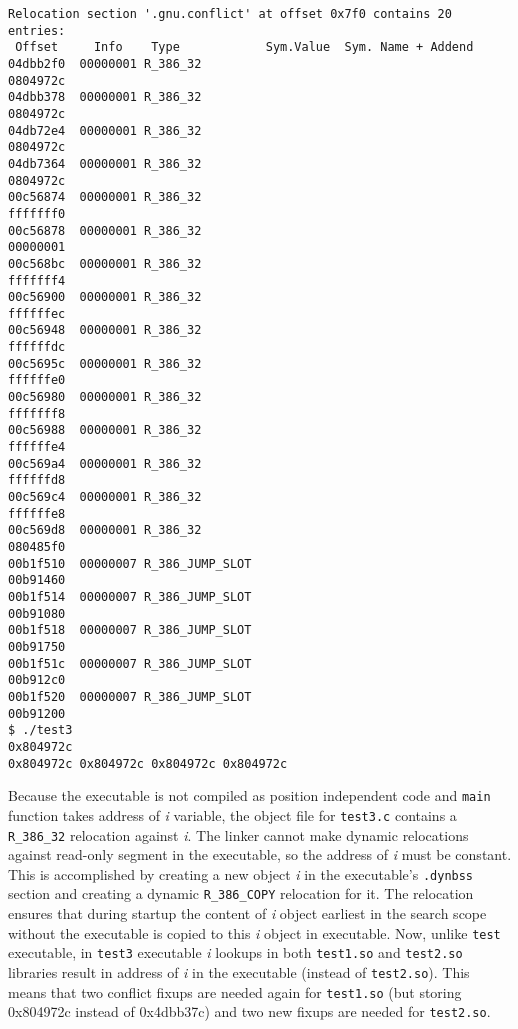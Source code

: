 \documentclass[twoside]{article}
\def\tts#1{\texttt{\small #1}}
\begin{document}
{{\begin{verbatim}
Relocation section '.gnu.conflict' at offset 0x7f0 contains 20 entries:
 Offset     Info    Type            Sym.Value  Sym. Name + Addend
04dbb2f0  00000001 R_386_32                                     0804972c
04dbb378  00000001 R_386_32                                     0804972c
04db72e4  00000001 R_386_32                                     0804972c
04db7364  00000001 R_386_32                                     0804972c
00c56874  00000001 R_386_32                                     fffffff0
00c56878  00000001 R_386_32                                     00000001
00c568bc  00000001 R_386_32                                     fffffff4
00c56900  00000001 R_386_32                                     ffffffec
00c56948  00000001 R_386_32                                     ffffffdc
00c5695c  00000001 R_386_32                                     ffffffe0
00c56980  00000001 R_386_32                                     fffffff8
00c56988  00000001 R_386_32                                     ffffffe4
00c569a4  00000001 R_386_32                                     ffffffd8
00c569c4  00000001 R_386_32                                     ffffffe8
00c569d8  00000001 R_386_32                                     080485f0
00b1f510  00000007 R_386_JUMP_SLOT                              00b91460
00b1f514  00000007 R_386_JUMP_SLOT                              00b91080
00b1f518  00000007 R_386_JUMP_SLOT                              00b91750
00b1f51c  00000007 R_386_JUMP_SLOT                              00b912c0
00b1f520  00000007 R_386_JUMP_SLOT                              00b91200
$ ./test3
0x804972c
0x804972c 0x804972c 0x804972c 0x804972c
\end{verbatim}}
}

Because the executable is not compiled as position independent code and
\tts{main} function takes address of {\sl i} variable, the object
file for \tts{test3.c} contains a \tts{R\_386\_32} relocation against
{\sl i}.  The linker cannot make dynamic relocations against read-only
segment in the executable, so the address of {\sl i} must be constant.
This is accomplished by creating a new object {\sl i} in the executable's
\tts{.dynbss} section and creating a dynamic \tts{R\_386\_COPY} relocation
for it.  The relocation ensures that during startup the content of
{\sl i} object earliest in the search scope without the executable
is copied to this {\sl i} object in executable.  Now, unlike \tts{test}
executable, in \tts{test3} executable {\sl i} lookups in both \tts{test1.so}
and \tts{test2.so} libraries result in address of {\sl i} in the executable
(instead of \tts{test2.so}).  This means that two conflict fixups
are needed again for \tts{test1.so} (but storing 0x804972c instead of
0x4dbb37c) and two new fixups are needed for \tts{test2.so}.
\end{document}

